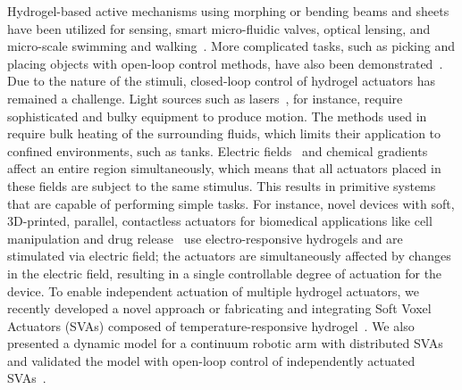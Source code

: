 Hydrogel-based active mechanisms using morphing or bending beams and sheets have been utilized for sensing, smart micro-fluidic valves, optical lensing, and micro-scale swimming and walking~\cite{Ionov2014}. More complicated tasks, such as picking and placing objects with open-loop control methods, have also been demonstrated~\cite{Wang2015b}. Due to the nature of the stimuli, closed-loop control of hydrogel actuators has remained a challenge. Light sources such as lasers~\cite{Luo2015}, for instance, require sophisticated and bulky equipment to produce motion. The methods used in~\cite{Kim2015a} require bulk heating of the surrounding fluids, which limits their application to confined environments, such as tanks. Electric fields~\cite{Morales2014} and  chemical gradients~\cite{Du2019, Nguyen2017} affect an entire region simultaneously, which means that all actuators placed in these fields are subject to the same stimulus. This results in primitive systems that are capable of performing  simple tasks. For instance, novel devices with soft, 3D-printed, parallel, contactless actuators for biomedical applications like cell manipulation and drug release~\cite{Zolfagharian2018} use electro-responsive hydrogels and are stimulated via electric field; the actuators are simultaneously affected by changes in the electric field, resulting in a single controllable degree of actuation for the device. To enable independent actuation of multiple hydrogel actuators, we recently developed a novel approach or fabricating and integrating Soft Voxel Actuators (SVAs) composed of temperature-responsive hydrogel~\cite{Khodambashi2021}. We also presented a dynamic model for a continuum robotic arm with distributed SVAs and validated the model with open-loop control of independently actuated SVAs~\cite{doroudchi2020dynamic}.  

